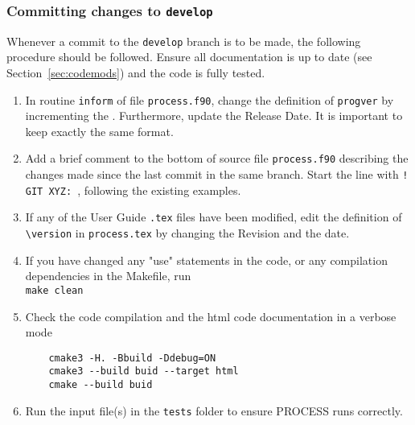 \documentclass[11pt,a4paper]{report}
\newcommand{\version}{
15 March 2019
\hfill
PROCESS version: 1.0.15
}
\begin{document}
\subsubsection{Committing changes to \texttt{develop}}

Whenever a commit to the \texttt{develop} branch is to be made, the following
procedure should be followed. Ensure all documentation is up to date (see
Section~\ref{sec:codemods}) and the code is fully tested.
\begin{enumerate}

\item In routine \texttt{inform} of file \texttt{process.f90}, change the
  definition of \texttt{progver} by incrementing the . Furthermore, update the Release Date. It is important to keep exactly the same format.

\item Add a brief comment to the bottom of source file \texttt{process.f90}
  describing the changes made since the last commit in the same branch. Start
  the line with \texttt{! GIT XYZ: }, following the existing examples.

\item If any of the User Guide \texttt{.tex} files have been modified, edit
  the definition of \verb+\version+ in \texttt{process.tex} by changing the
  Revision  and the date.

\item If you have changed any "use" statements in the code, or any compilation dependencies in the Makefile, run \\
\texttt{make clean}

\item Check the code compilation and the html code documentation in a verbose mode
\begin{center}
	\begin{verbatim}
	cmake3 -H. -Bbuild -Ddebug=ON
	cmake3 --build buid --target html
	cmake --build buid
	\end{verbatim}
\end{center}

\item Run the input file(s) in the \texttt{tests} folder to ensure PROCESS runs correctly.


\end{enumerate}
\end{document}
